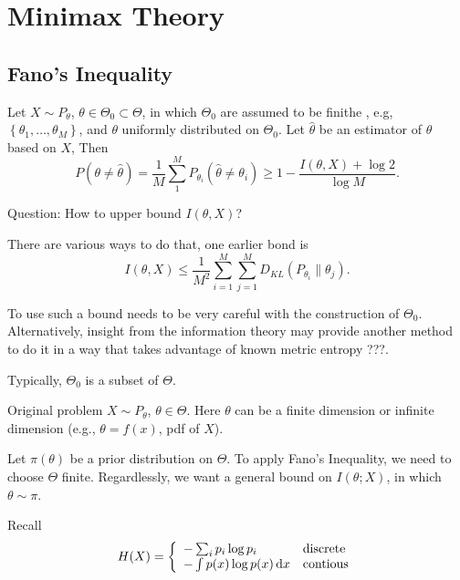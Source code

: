 \chapter{Minimax Theory}

\section{Fano's Inequality}

Let $X\sim P_{\theta}$, $\theta\in\Theta_{0}\subset\Theta$, in which $\Theta_{0}$ are assumed to be finithe , e.g, $\left\{\theta_{1},\ldots,\theta_{M}\right\}$, and $\theta$ uniformly distributed on $\Theta_{0}$. Let $\hat{\theta}$ be an estimator of $\theta$ based on $X$, Then
\begin{equation}
	P\left(\theta\neq\hat{\theta}\right)=\frac{1}{M}\sum_{1}^{M}P_{\theta_{i}}\left(\hat{\theta}\neq\theta_{i}\right)\geq 1-\frac{I\left(\theta,X\right)+\log 2}{\log M}.
\end{equation}

Question: How to upper bound $I\left(\theta, X\right)$?

There are various ways to do that, one earlier bond is
\begin{equation}
	I\left(\theta,X\right)\leq\frac{1}{M^{2}}\sum_{i=1}^{M}\sum_{j=1}^{M}D_{KL}\left(P_{\theta_{i}}\|\theta_{j}\right).
\end{equation}

To use such a bound needs to be very careful with the construction of $\Theta_{0}$. Alternatively, insight from the information theory may provide another method to do it in a way that takes advantage of known metric entropy ???.

Typically, $\Theta_{0}$ is a subset of $\Theta$.

Original problem $X\sim P_{\theta}$, $\theta\in\Theta$. Here $\theta$ can be a finite dimension or infinite dimension (e.g., $\theta=f(x)$, pdf of $X$).

Let $\pi(\theta)$ be a prior distribution on $\Theta$. To apply Fano's Inequality, we need to choose $\Theta$ finite. Regardlessly, we want a general bound on $I\left(\theta; X\right)$, in which $\theta\sim\pi$.

Recall
\begin{equation}
	H(X)=\left\{\begin{array}{ll}
		-\sum_{i}p_{i}\log p_{i}  & \text{discrete} \\
		-\int p(x)\log p(x)\mathop{}\!\mathrm{d} x & \text{contious}
	\end{array}\right.
\end{equation}

